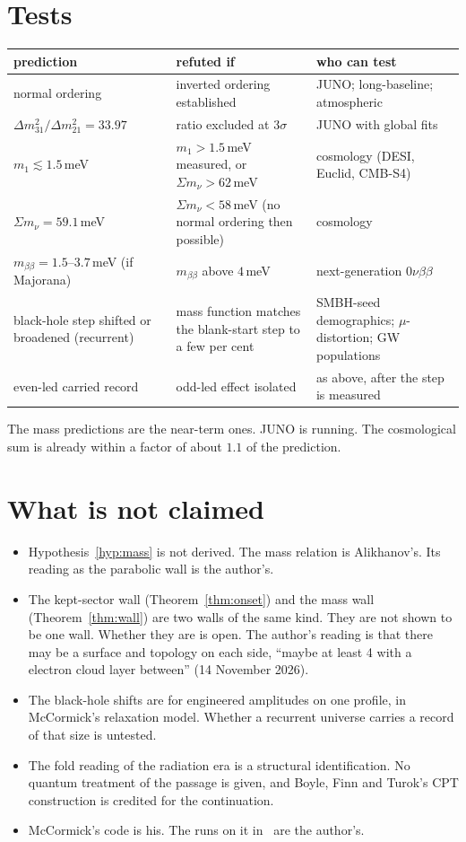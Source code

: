\documentclass[11pt]{article}
\theoremstyle{definition}\newtheorem{hypothesis}{Hypothesis}\newtheorem{prediction}{Prediction}
\theoremstyle{remark}\newtheorem{remark}[theorem]{Remark}
\begin{document}
\section{Tests}\label{sec:tests}
\begin{center}\small\begin{tabular}{p{}p{}p{}}\toprule
prediction & refuted if & who can test\\\midrule
normal ordering & inverted ordering established & JUNO; long-baseline; atmospheric\\
$\Delta m^2_{31}/\Delta m^2_{21}=33.97$ & ratio excluded at $3\sigma$ & JUNO with global fits\\
$m_1\lesssim1.5$\,meV & $m_1>1.5$\,meV measured, or $\Sigma m_\nu>62$\,meV & cosmology (DESI, Euclid, CMB-S4)\\
$\Sigma m_\nu=59.1$\,meV & $\Sigma m_\nu<58$\,meV (no normal ordering then possible) & cosmology\\
$m_{\beta\beta}=1.5$--$3.7$\,meV (if Majorana) & $m_{\beta\beta}$ above $4$\,meV & next-generation $0\nu\beta\beta$\\
black-hole step shifted or broadened (recurrent) & mass function matches the blank-start step to a few per cent & SMBH-seed demographics; $\mu$-distortion; GW populations\\
even-led carried record & odd-led effect isolated & as above, after the step is measured\\\bottomrule\end{tabular}\end{center}
The mass predictions are the near-term ones. JUNO is running. The cosmological sum is already within a factor of about $1.1$ of the prediction.

\section{What is not claimed}\label{sec:notclaimed}
\begin{itemize}[nosep]
\item Hypothesis~\ref{hyp:mass} is not derived. The mass relation is Alikhanov's. Its reading as the parabolic wall is the author's.
\item The kept-sector wall (Theorem~\ref{thm:onset}) and the mass wall (Theorem~\ref{thm:wall}) are two walls of the same kind. They are not shown to be one wall. Whether they are is open. The author's reading is that there may be a surface and topology on each side, ``maybe at least 4 with a electron cloud layer between'' (14 November 2026).
\item The black-hole shifts are for engineered amplitudes on one profile, in McCormick's relaxation model. Whether a recurrent universe carries a record of that size is untested.
\item The fold reading of the radiation era is a structural identification. No quantum treatment of the passage is given, and Boyle, Finn and Turok's CPT construction is credited for the continuation.
\item McCormick's code is his. The runs on it in~\cite{NU10} are the author's.
\end{itemize}
\end{document}
